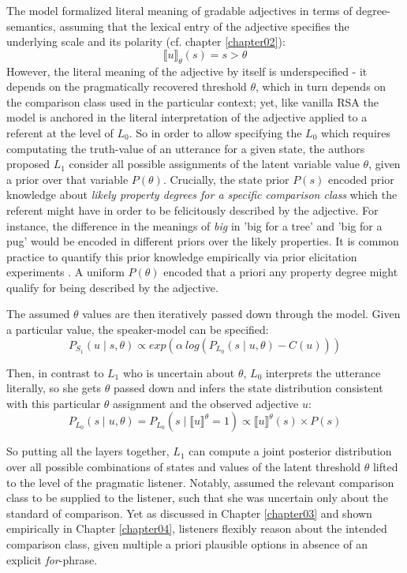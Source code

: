 The model formalized literal meaning of gradable adjectives in terms of degree-semantics, assuming that the lexical entry of the adjective specifies the underlying scale and its polarity (cf. chapter \ref{chapter02}):
$$\llbracket u \rrbracket_{\theta} (s) = s > \theta$$
However, the literal meaning of the adjective by itself is underspecified - it depends on the pragmatically recovered threshold $\theta$, which in turn depends on the comparison class used in the particular context; yet, like vanilla RSA the model is anchored in the literal interpretation of the adjective applied to a referent at the level of $L_0$.  
So in order to allow specifying the $L_0$ which requires computating the truth-value of an utterance for a given state, the authors proposed $L_1$ consider all possible assignments of the latent variable value $\theta$, given a prior over that variable $P(\theta)$. Crucially, the state prior $P(s)$ encoded prior knowledge about \emph{likely property degrees for a specific comparison class} which the referent might have in order to be felicitously described by the adjective. For instance, the difference in the meanings of \emph{big} in 'big for a tree' and 'big for a pug' would be encoded in different priors over the likely properties. It is common practice to quantify this prior knowledge empirically via prior elicitation experiments \parencite{problang}. A uniform $P(\theta)$ encoded that a priori any property degree might qualify for being described by the adjective. 

The assumed $\theta$ values are then iteratively passed down through the model. Given a particular value, the speaker-model can be specified:
$$P_{S_1} (u \mid s, \theta) \propto exp(\alpha \: log (P_{L_0} (s \mid u, \theta) - C(u)) )$$

Then, in contrast to $L_1$ who is uncertain about $\theta$, $L_0$ interprets the utterance literally, so she gets $\theta$ passed down and infers the state distribution consistent with this particular $\theta$ assignment and the observed adjective $u$:
$$P_{L_0} (s \mid u, \theta) = P_{L_0} (s \mid \llbracket u \rrbracket ^\theta = 1 ) \propto \llbracket u \rrbracket ^\theta (s) \times P(s)$$

So putting all the layers together, $L_1$ can compute a joint posterior distribution over all possible combinations of states and values of the latent threshold $\theta$ lifted to the level of the pragmatic listener. Notably, \textcite{lassiter2013context} assumed the relevant comparison class to be supplied to the listener, such that she was uncertain only about the standard of comparison. Yet as discussed in Chapter \ref{chapter03} and shown empirically in Chapter \ref{chapter04}, listeners flexibly reason about the intended comparison class, given multiple a priori plausible options in absence of an explicit \emph{for}-phrase.

